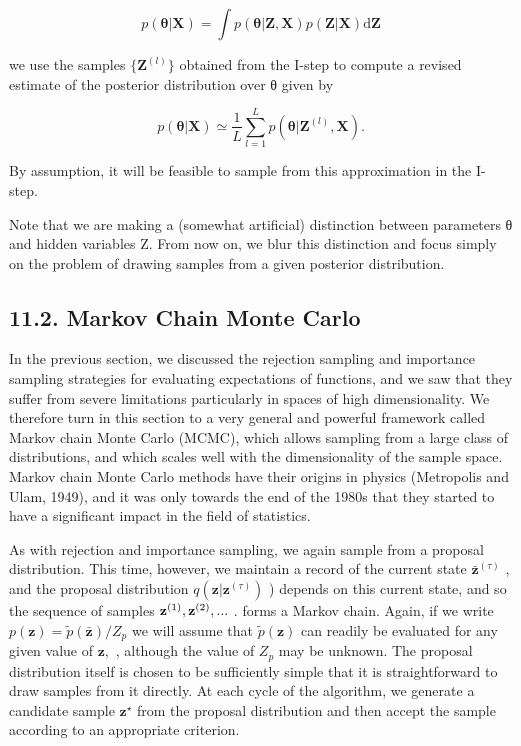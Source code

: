 \documentclass[
  10
]{article}
\begin{document}
\[
p (\pmb {\theta} | \mathbf {X}) = \int p (\pmb {\theta} | \mathbf {Z}, \mathbf {X}) p (\mathbf {Z} | \mathbf {X}) \mathrm{d} \mathbf {Z}\tag{11.31}
\]

we use the samples \(\{ \mathbf { Z } ^ { ( l ) } \}\) obtained from the
I-step to compute a revised estimate of the posterior distribution over
θ given by

\[
p (\boldsymbol {\theta} | \mathbf {X}) \simeq \frac {1}{L} \sum_ {l = 1} ^ {L} p (\boldsymbol {\theta} | \mathbf {Z} ^ {(l)}, \mathbf {X}).\tag{11.32}
\]

By assumption, it will be feasible to sample from this approximation in
the I-step.

Note that we are making a (somewhat artificial) distinction between
parameters θ and hidden variables Z. From now on, we blur this
distinction and focus simply on the problem of drawing samples from a
given posterior distribution.

\subsection{11.2. Markov Chain Monte
Carlo}\label{markov-chain-monte-carlo}

In the previous section, we discussed the rejection sampling and
importance sampling strategies for evaluating expectations of functions,
and we saw that they suffer from severe limitations particularly in
spaces of high dimensionality. We therefore turn in this section to a
very general and powerful framework called Markov chain Monte Carlo
(MCMC), which allows sampling from a large class of distributions, and
which scales well with the dimensionality of the sample space. Markov
chain Monte Carlo methods have their origins in physics (Metropolis and
Ulam, 1949), and it was only towards the end of the 1980s that they
started to have a significant impact in the field of statistics.

As with rejection and importance sampling, we again sample from a
proposal distribution. This time, however, we maintain a record of the
current state \(\bar { \mathbf { z } } ^ { ( \tau ) }\) , and the
proposal distribution
\(q ( \mathbf { z } | \mathbf { z } ^ { ( \tau ) } )\) ) depends on this
current state, and so the sequence of samples
\({ \bf z } ^ { ( 1 ) } , { \bf z } ^ { ( 2 ) } , . . .\) . forms a
Markov chain. Again, if we write
\(p ( \mathbf { z } ) = \widetilde { p } ( \mathbf { \bar { z } } ) / Z _ { p }\)
we will assume that \(\widetilde { p } ( \mathbf { z } )\) can readily
be evaluated for any given value of \(\mathbf { z } ,\) , although the
value of \(Z _ { p }\) may be unknown. The proposal distribution itself
is chosen to be sufficiently simple that it is straightforward to draw
samples from it directly. At each cycle of the algorithm, we generate a
candidate sample \(\mathbf { z } ^ { \star }\) from the proposal
distribution and then accept the sample according to an appropriate
criterion.
\end{document}
